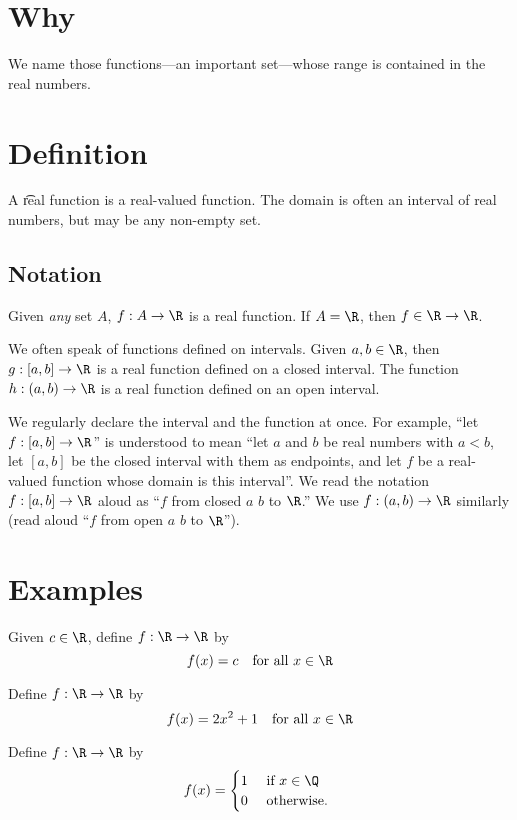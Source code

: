 
\section*{Why}

We name those functions---an important set---whose range is contained in the real numbers.

\section*{Definition}

A \t{real function} is a real-valued function.
The domain is often an interval of real numbers, but may be any non-empty set.

\subsection*{Notation}

Given \textit{any} set $A$, $f: A \to \R $ is a real function.
If $A = \R $, then $f \in \R  \to \R $.

We often speak of functions defined on intervals.
Given $a, b \in \R $, then $g: [a, b] \to \R $ is a real function defined on a closed interval.
The function $h: (a, b) \to \R $ is a real function defined on an open interval.

We regularly declare the interval and the function at once.
For example, ``let $f: [a, b] \to \R $'' is understood to mean ``let $a$ and $b$ be real numbers with $a < b$, let $[a, b]$ be the closed interval with them as endpoints, and let $f$ be a real-valued function whose domain is this interval''.
We read the notation $f: [a, b] \to \R $ aloud as ``$f$ from closed $a$ $b$ to $\R $.''
We use $f: (a, b) \to \R $ similarly (read aloud ``$f$ from open $a$ $b$ to $\R $'').

\section*{Examples}

\begin{example}
Given $c \in \R $, define $f: \R  \to \R $ by
\[
f(x) = c \quad \text{for all } x \in \R
\]
\end{example}

\begin{example}
Define $f: \R  \to \R $ by
\[
f(x) = 2x^2 + 1 \quad \text{for all } x \in \R
\]
\end{example}

\begin{example}
Define $f: \R  \to \R $ by
\[
f(x) = \begin{cases}
1 & \text{ if } x \in \Q  \\
0 & \text{ otherwise. }
\end{cases}
\]
\end{example}

\blankpage